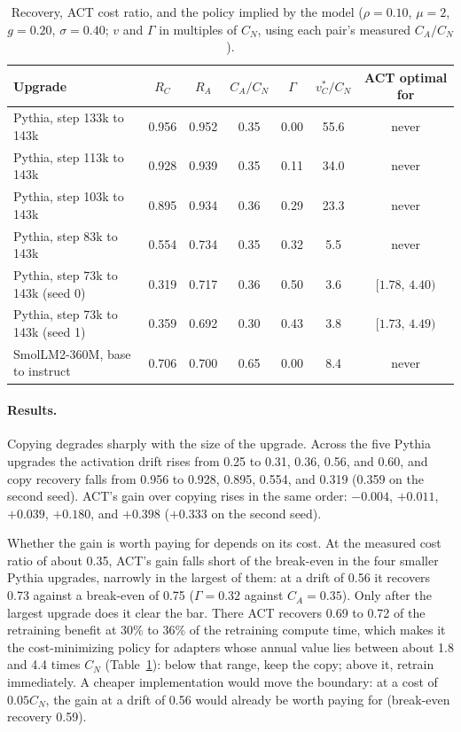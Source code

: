 \documentclass[acmsmall,review]{acmart}
\begin{document}
\begin{table}[t]
\centering
\caption{Recovery, ACT cost ratio, and the policy implied by the model ($\rho=0.10$, $\mu=2$, $g=0.20$, $\sigma=0.40$; $v$ and $\Gamma$ in multiples of $C_N$, using each pair's measured $C_A/C_N$).}\label{tab:pairs}
\begin{tabular}{lcccccc}
\toprule
Upgrade & $R_C$ & $R_A$ & $C_A/C_N$ & $\Gamma$ & $v^*_C/C_N$ & ACT optimal for\\
\midrule
Pythia, step 133k to 143k & 0.956 & 0.952 & 0.35 & 0.00 & 55.6 & never\\
Pythia, step 113k to 143k & 0.928 & 0.939 & 0.35 & 0.11 & 34.0 & never\\
Pythia, step 103k to 143k & 0.895 & 0.934 & 0.36 & 0.29 & 23.3 & never\\
Pythia, step 83k to 143k & 0.554 & 0.734 & 0.35 & 0.32 & 5.5 & never\\
Pythia, step 73k to 143k (seed 0) & 0.319 & 0.717 & 0.36 & 0.50 & 3.6 & $[1.78,\,4.40)$\\
Pythia, step 73k to 143k (seed 1) & 0.359 & 0.692 & 0.30 & 0.43 & 3.8 & $[1.73,\,4.49)$\\
SmolLM2-360M, base to instruct & 0.706 & 0.700 & 0.65 & 0.00 & 8.4 & never\\
\bottomrule
\end{tabular}
\end{table}

\paragraph{Results.} Copying degrades sharply with the size of the upgrade. Across the five Pythia upgrades the activation drift rises from 0.25 to 0.31, 0.36, 0.56, and 0.60, and
copy recovery falls from 0.956 to 0.928, 0.895, 0.554, and 0.319 (0.359 on the second seed). ACT's gain over copying rises in the same order: $-0.004$, $+0.011$, $+0.039$, $+0.180$, and $+0.398$ ($+0.333$ on the second seed).

Whether the gain is worth paying for depends on its cost. At the measured cost ratio of about 0.35, ACT's gain falls short of the break-even in the four smaller Pythia upgrades, narrowly in the largest of them: at a drift of 0.56 it recovers 0.73 against a break-even of 0.75 ($\Gamma=0.32$ against $C_A=0.35$).
Only after the largest upgrade does it clear the bar. There ACT recovers 0.69 to 0.72 of the retraining benefit at 30\% to 36\% of the retraining compute time, which makes it the cost-minimizing policy for adapters
whose annual value lies between about 1.8 and 4.4 times $C_N$ (Table~\ref{tab:pairs}): below that range, keep the copy; above it, retrain immediately. A cheaper implementation would move the boundary: at a cost of $0.05C_N$, the gain at a drift of 0.56 would already be worth paying for (break-even recovery 0.59).
\end{document}
